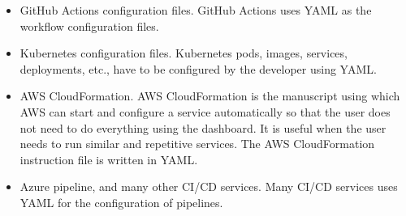 \begin{itemize}
	\item GitHub Actions configuration files. GitHub Actions uses YAML as the workflow configuration files.
	\item Kubernetes configuration files. Kubernetes pods, images, services, deployments, etc., have to be configured by the developer using YAML.
	\item AWS CloudFormation. AWS CloudFormation is the manuscript using which AWS can start and configure a service automatically so that the user does not need to do everything using the dashboard. It is useful when the user needs to run similar and repetitive services. The AWS CloudFormation instruction file is written in YAML.
	\item Azure pipeline, and many other CI/CD services. Many CI/CD services uses YAML for the configuration of pipelines.
\end{itemize} 